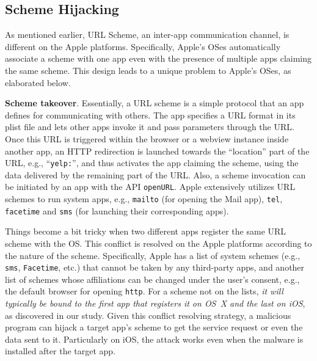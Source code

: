 \documentclass{article}
\newcommand{\ignore}[1]{}
\begin{document}
\subsection{Scheme Hijacking}
\label{subsec:scheme}


As mentioned earlier, URL Scheme, an inter-app communication channel, is different on the Apple platforms. Specifically, Apple's OSes automatically associate a scheme with one app even with the presence of multiple apps claiming the same scheme. This design leads to a unique problem to Apple's OSes, \ignore{Compared with NSConnection and WebSocket, Scheme is simpler and does not involve server and client components. However, this channel is equally vulnerable} \ignore{: our research shows that oftentimes, Scheme has not been used by app developers in a secure manner, which opens an avenue for an unauthorized app,  even when it is confined within the sandbox, to access other apps' internal resources}as elaborated below.  

\vspace {3pt}\noindent\textbf{Scheme takeover}.  Essentially, a URL scheme is a simple protocol that an app defines for communicating with others. The app specifies a URL format in its plist file and lets other apps invoke it and pass parameters through the URL. Once this URL is triggered within the browser or a webview instance inside another app, an HTTP redirection is launched towards the ``location'' part of the URL, e.g., ``\texttt{yelp:}'', and thus activates the app claiming the scheme, using the data delivered by the remaining part of the URL.  Also, a scheme invocation can be initiated by an app with the API \texttt{openURL}. Apple extensively utilizes URL schemes to run system apps, e.g., \texttt{mailto} (for opening the Mail app), \texttt{tel}, \texttt{facetime} and \texttt{sms} (for launching their corresponding apps).



Things become a bit tricky when two different apps register the same URL scheme with the OS.  This conflict is resolved on the Apple platforms according to the nature of the scheme. Specifically, Apple has a list of system schemes (e.g., \texttt{sms}, \texttt{Facetime}, etc.) that cannot be taken by any third-party apps, and another list of schemes whose affiliations can be changed under the user's consent, e.g., the default browser for opening \texttt{http}. For a scheme not on the lists, \textit{it will typically be bound to the first app that registers it on OS~X and the last on iOS}, as discovered in our study. Given this conflict resolving strategy, a malicious program can hijack a target app's scheme to get the service request or even the data sent to it. Particularly on iOS, the attack works even when the malware is installed after the target app.
\end{document}
